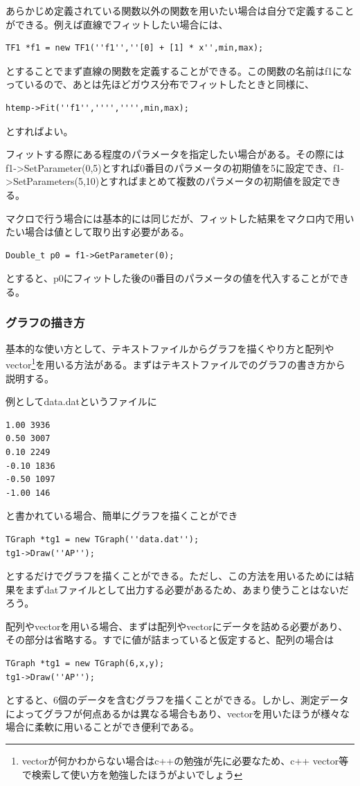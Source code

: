 \documentclass[10pt]{ujarticle}
\begin{document}
あらかじめ定義されている関数以外の関数を用いたい場合は自分で定義することができる。例えば直線でフィットしたい場合には、
\begin{lstlisting}
TF1 *f1 = new TF1(''f1'',''[0] + [1] * x'',min,max);
 \end{lstlisting}
とすることでまず直線の関数を定義することができる。この関数の名前はf1になっているので、あとは先ほどガウス分布でフィットしたときと同様に、
\begin{lstlisting}
htemp->Fit(''f1'','''','''',min,max);
 \end{lstlisting}
とすればよい。

フィットする際にある程度のパラメータを指定したい場合がある。その際にはf1->SetParameter(0,5)とすれば0番目のパラメータの初期値を5に設定でき、f1->SetParameters(5,10)とすればまとめて複数のパラメータの初期値を設定できる。

マクロで行う場合には基本的には同じだが、フィットした結果をマクロ内で用いたい場合は値として取り出す必要がある。
\begin{lstlisting}
Double_t p0 = f1->GetParameter(0);
 \end{lstlisting}
とすると、p0にフィットした後の0番目のパラメータの値を代入することができる。

\subsubsection{グラフの描き方}
基本的な使い方として、テキストファイルからグラフを描くやり方と配列やvector\footnote{vectorが何かわからない場合はc++の勉強が先に必要なため、c++ vector等で検索して使い方を勉強したほうがよいでしょう}を用いる方法がある。まずはテキストファイルでのグラフの書き方から説明する。

例としてdata.datというファイルに
\begin{lstlisting}
1.00 3936
0.50 3007
0.10 2249
-0.10 1836
-0.50 1097
-1.00 146
 \end{lstlisting}
 と書かれている場合、簡単にグラフを描くことができ
\begin{lstlisting}
TGraph *tg1 = new TGraph(''data.dat'');
tg1->Draw(''AP'');
 \end{lstlisting}
とするだけでグラフを描くことができる。ただし、この方法を用いるためには結果をまずdatファイルとして出力する必要があるため、あまり使うことはないだろう。

配列やvectorを用いる場合、まずは配列やvectorにデータを詰める必要があり、その部分は省略する。すでに値が詰まっていると仮定すると、配列の場合は
\begin{lstlisting}
TGraph *tg1 = new TGraph(6,x,y);
tg1->Draw(''AP'');
 \end{lstlisting}
とすると、6個のデータを含むグラフを描くことができる。しかし、測定データによってグラフが何点あるかは異なる場合もあり、vectorを用いたほうが様々な場合に柔軟に用いることができ便利である。
\end{document}
